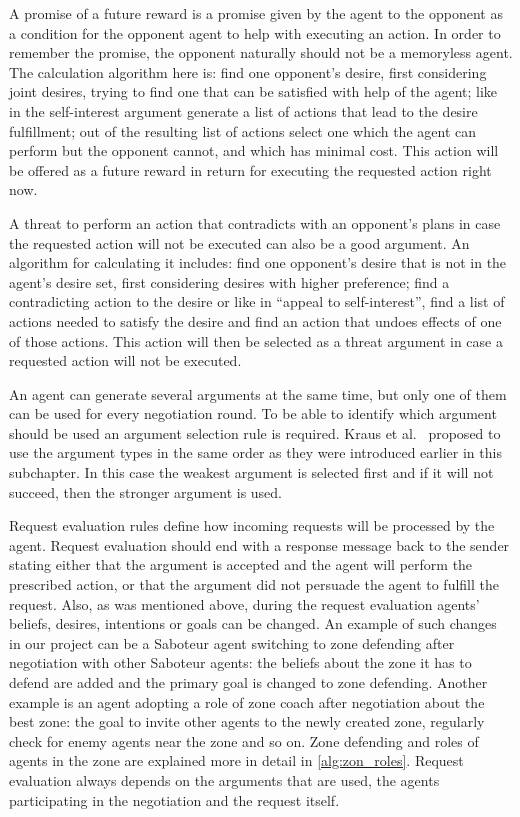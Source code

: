 A promise of a future reward is a promise given by the agent to the opponent as a condition for the opponent agent to help with executing an action.
In order to remember the promise, the opponent naturally should not be a memoryless agent.
The calculation algorithm here is: find one opponent's desire, first considering joint desires, trying to find one that can be satisfied with help of the agent; like in the self-interest argument generate a list of actions that lead to the desire fulfillment; out of the resulting list of actions select one which the agent can perform but the opponent cannot, and which has minimal cost.
This action will be offered as a future reward in return for executing the requested action right now.

A threat to perform an action that contradicts with an opponent's plans in case the requested action will not be executed can also be a good argument.
An algorithm for calculating it includes: find one opponent's desire that is not in the agent's desire set, first considering desires with higher preference; find a contradicting action to the desire or like in \enquote{appeal to self-interest}, find a list of actions needed to satisfy the desire and find an action that undoes effects of one of those actions.
This action will then be selected as a threat argument in case a requested action will not be executed.

An agent can generate several arguments at the same time, but only one of them can be used for every negotiation round.
To be able to identify which argument should be used an argument selection rule is required.
Kraus et al.~\cite{Kraus_98} proposed to use the argument types in the same order as they were introduced earlier in this subchapter.
In this case the weakest argument is selected first and if it will not succeed, then the stronger argument is used.

Request evaluation rules define how incoming requests will be processed by the agent.
Request evaluation should end with a response message back to the sender stating either that the argument is accepted and the agent will perform the prescribed action, or that the argument did not persuade the agent to fulfill the request.
Also, as was mentioned above, during the request evaluation agents' beliefs, desires, intentions or goals can be changed.
An example of such changes in our project can be a Saboteur agent switching to zone defending after negotiation with other Saboteur agents: the beliefs about the zone it has to defend are added and the primary goal is changed to zone defending.
Another example is an agent adopting a role of zone coach after negotiation about the best zone: the goal to invite other agents to the newly created zone, regularly check for enemy agents near the zone and so on.
Zone defending and roles of agents in the zone are explained more in detail in \autoref{alg:zon_roles}.
Request evaluation always depends on the arguments that are used, the agents participating in the negotiation and the request itself.

